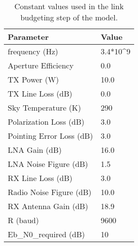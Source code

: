 \begin{table}[!ht]
\centering
\begin{tabular}{|l|l|}
\hline
\textbf{Parameter}      & \textbf{Value}            \\ \hline
frequency (Hz)          & 3.4*10\textasciicircum{}9 \\ \hline
Aperture Efficiency     & 0.0                       \\ \hline
TX Power (W)            & 10.0                      \\ \hline
TX Line Loss (dB)       & 0.0                       \\ \hline
Sky Temperature (K)      & 290                       \\ \hline
Polarization Loss (dB)   & 3.0                       \\ \hline
Pointing Error Loss (dB)  & 3.0                       \\ \hline
LNA Gain (dB)           & 16.0                      \\ \hline
LNA Noise Figure (dB)   & 1.5                       \\ \hline
RX Line Loss (dB)       & 3.0                       \\ \hline
Radio Noise Figure (dB) & 10.0                      \\ \hline
RX Antenna Gain (dB)    & 18.9                      \\ \hline
R (baud)                & 9600                      \\ \hline
Eb\_N0\_required (dB)   & 10                        \\ \hline
\end{tabular}
\vspace{2 mm}
\caption{Constant values used in the link budgeting step of the model.}
\label{DownlinkParameters}
\end{table}



